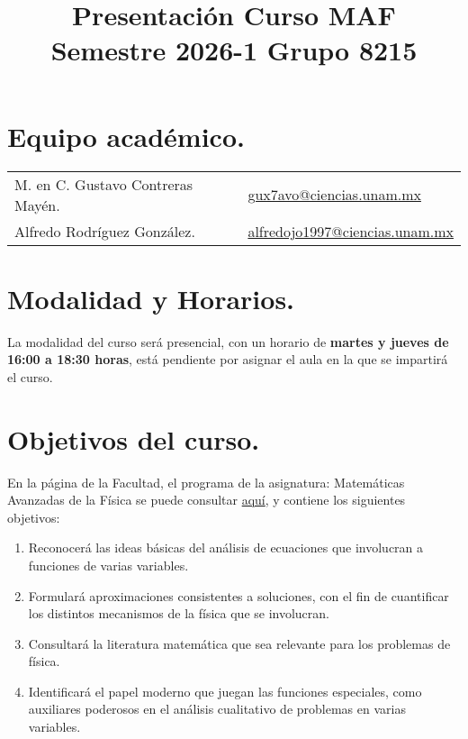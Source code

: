 \documentclass[14pt]{extarticle}
\title{Presentación Curso MAF \\ \large{Semestre 2026-1 \vspace{2cm} Grupo 8215}\vspace{-3ex}}
\author{}
\date{ }
\numberwithin{equation}{section}
\begin{document}
\vspace{-4cm}
\maketitle

\section{Equipo académico.}

\begin{table}[H]
\renewcommand{\arraystretch}{1.2}
\begin{tabular}{l l}
M. en C. Gustavo Contreras Mayén. & \href{mailto:gux7avo@ciencias.unam.mx}{gux7avo@ciencias.unam.mx} \\
Alfredo Rodríguez González. & \href{mailto:alfredojo1997@ciencias.unam.mx}{alfredojo1997@ciencias.unam.mx}
\end{tabular}
\end{table}

\section{Modalidad y Horarios.}

La modalidad del curso será presencial, con un horario de \textbf{martes y jueves de 16:00 a 18:30 horas}, está pendiente por asignar el aula en la que se impartirá el curso.

\section{Objetivos del curso.}

En la página de la Facultad, el programa de la asignatura: Matemáticas Avanzadas de la Física se puede consultar 
\href{https://www.fciencias.unam.mx/sites/default/files/temario/610.pdf}{aquí}, y contiene los siguientes objetivos:
\begin{enumerate}
\item Reconocerá las ideas básicas del análisis de ecuaciones que involucran a funciones de varias variables.
\item Formulará aproximaciones consistentes a soluciones, con el fin de cuantificar los distintos mecanismos de la física que se involucran.
\item Consultará la literatura matemática que sea relevante para los problemas de física.
\item Identificará el papel moderno que juegan las funciones especiales, como auxiliares poderosos en el análisis cualitativo de problemas en varias variables.
\end{enumerate}
\end{document}
